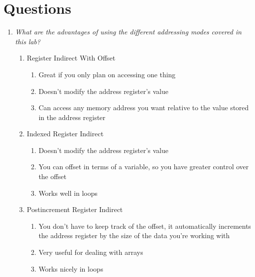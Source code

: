 \documentclass[letterpaper]{article}
\begin{document}
\section{Questions}
  \begin{enumerate}
    \item \textit{What are the advantages of using the different addressing modes covered in this lab?}
          \begin{enumerate}
            \item Register Indirect With Offset
              \begin{enumerate}
                \item Great if you only plan on accessing one thing
                \item Doesn't modify the address register's value
                \item Can access any memory address you want relative to the value stored in the address register
              \end{enumerate}
            \item Indexed Register Indirect
            \begin{enumerate}
              \item Doesn't modify the address register's value
              \item You can offset in terms of a variable, so you have greater control over the offset
              \item Works well in loops
            \end{enumerate}
            \item Postincrement Register Indirect
            \begin{enumerate}
              \item You don't have to keep track of the offset, it automatically
                    increments the address register by the size of the data
                    you're working with
              \item Very useful for dealing with arrays
              \item Works nicely in loops
            \end{enumerate}
          \end{enumerate}


\end{enumerate}
\end{document}

